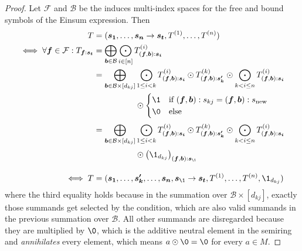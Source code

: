 \begin{proof}
    \small
    Let $\mathcal{F}$ and $\mathcal{B}$ be the induces multi-index spaces for the free and bound symbols of the Einsum expression.
    Then
    \begin{align*}
        T                                                        & = (\bm{s_1}, \dots, \bm{s_n} \rightarrow \bm{s_t}, T^{(1)}, \dots, T^{(n)})                                                                                                                                                                        \\
        \iff \forall \bm{f} \in \mathcal{F}: T_{\bm{f}:\bm{s_t}} & = \bigoplus\limits_{\bm{b} \in \mathcal{B}} \bigodot\limits_{i \in [n]} T^{(i)}_{(\bm{f}, \bm{b}):\bm{s_i}}                                                                                                                                        \\
                                                                 & = \bigoplus\limits_{\bm{b} \in \mathcal{B} \times [d_{kj}]} \bigodot\limits_{1 \leq i < k} T^{(i)}_{(\bm{f}, \bm{b}):\bm{s_i}} \odot T^{(k)}_{(\bm{f}, \bm{b}):\bm{s'_k}} \odot \bigodot\limits_{k < i \leq n} T^{(i)}_{(\bm{f}, \bm{b}):\bm{s_i}} \\
                                                                 & \phantom{{}=\bigoplus\limits_{\bm{b} \in \mathcal{B} \times [d_{kj}]}} \odot \begin{cases}
            \1 & \text{if $(\bm{f}, \bm{b}): s_{kj} = (\bm{f}, \bm{b}): s_{\text{new}}$} \\
            \0 & \text{else}
        \end{cases}                                                                                                                                             \\
                                                                 & = \bigoplus\limits_{\bm{b} \in \mathcal{B} \times [d_{kj}]} \bigodot\limits_{1 \leq i < k} T^{(i)}_{(\bm{f}, \bm{b}):\bm{s_i}} \odot T^{(k)}_{(\bm{f}, \bm{b}):\bm{s'_k}} \odot \bigodot\limits_{k < i \leq n} T^{(i)}_{(\bm{f}, \bm{b}):\bm{s_i}} \\
                                                                 & \phantom{{}=\bigoplus\limits_{\bm{b} \in \mathcal{B} \times [d_{kj}]}} \odot \left(\1_{d_{kj}}\right)_{(\bm{f}, \bm{b}):\bm{s_\1}}                                                                                                                 \\
        \iff T                                                   & = (\bm{s_1}, \dots, \bm{s'_k}, \dots, \bm{s_n}, \bm{s_\1} \rightarrow \bm{s_t}, T^{(1)}, \dots, T^{(n)}, \1_{d_{kj}})
    \end{align*}
    where the third equality holds because in the summation over $\mathcal{B} \times [d_{kj}]$, exactly those summands get selected by the condition, which are also valid summands in the previous summation over $\mathcal{B}$.
    All other summands are disregarded because they are multiplied by $\0$, which is the additive neutral element in the semiring and \textit{annihilates} every element, which means $a \odot \0 = \0$ for every $a \in M$.
\end{proof}
\bigskip